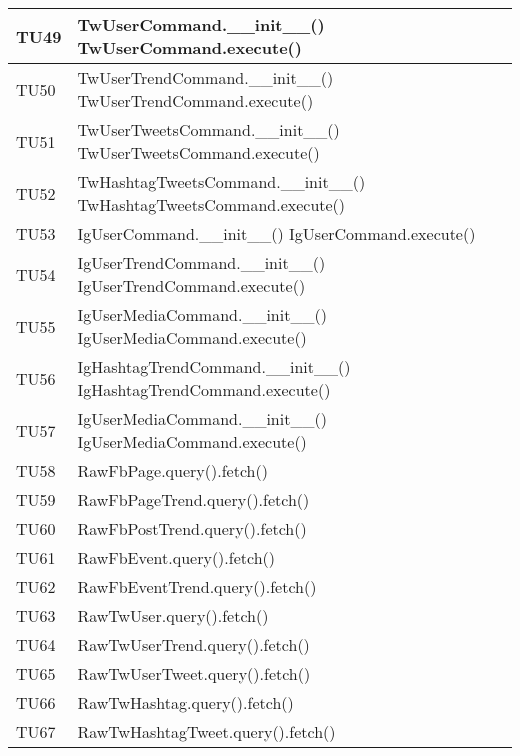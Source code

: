 \begin{center}
\begin{longtable}{| p{3cm} | p{9.5cm} |}
					\hline
					TU49 & TwUserCommand.\_\_init\_\_() \newline
					TwUserCommand.execute() \\
					\hline
					TU50 & TwUserTrendCommand.\_\_init\_\_() \newline
					TwUserTrendCommand.execute() \\
					\hline
					TU51 & TwUserTweetsCommand.\_\_init\_\_() \newline
					TwUserTweetsCommand.execute() \\
					\hline
					TU52 & TwHashtagTweetsCommand.\_\_init\_\_() \newline
					TwHashtagTweetsCommand.execute() \\
					\hline
					TU53 & IgUserCommand.\_\_init\_\_() \newline
					IgUserCommand.execute() \\
					\hline
					TU54 & IgUserTrendCommand.\_\_init\_\_() \newline
					IgUserTrendCommand.execute() \\
					\hline
					TU55 & IgUserMediaCommand.\_\_init\_\_() \newline
					IgUserMediaCommand.execute() \\
					\hline
					TU56 & IgHashtagTrendCommand.\_\_init\_\_() \newline
					IgHashtagTrendCommand.execute() \\
					\hline
					TU57 & IgUserMediaCommand.\_\_init\_\_() \newline
					IgUserMediaCommand.execute() \\
					\hline
					TU58 & RawFbPage.query().fetch() \\
					\hline
					TU59 & RawFbPageTrend.query().fetch() \\
					\hline
					TU60 & RawFbPostTrend.query().fetch() \\
					\hline
					TU61 & RawFbEvent.query().fetch() \\
					\hline
					TU62 & RawFbEventTrend.query().fetch() \\
					\hline
					TU63 & RawTwUser.query().fetch() \\
					\hline
					TU64 & RawTwUserTrend.query().fetch() \\
					\hline
					TU65 & RawTwUserTweet.query().fetch() \\
					\hline
					TU66 & RawTwHashtag.query().fetch() \\
					\hline
					TU67 & RawTwHashtagTweet.query().fetch() \\

\end{longtable}
\end{center}
